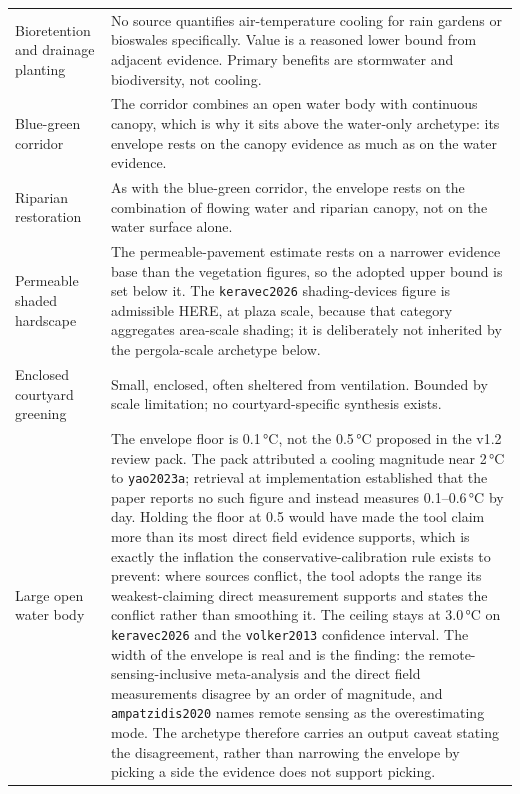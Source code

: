 \begin{longtable}{@{}>{\raggedright\arraybackslash}p{30mm}
                    >{\raggedright\arraybackslash}p{95mm}@{}}
\addlinespace
Bioretention and drainage planting &
No source quantifies air-temperature cooling for rain gardens or bioswales specifically. Value is a reasoned lower bound from adjacent evidence. Primary benefits are stormwater and biodiversity, not cooling. \\
\addlinespace
Blue-green corridor &
The corridor combines an open water body with continuous canopy, which is why it sits above the water-only archetype: its envelope rests on the canopy evidence as much as on the water evidence. \\
\addlinespace
Riparian restoration &
As with the blue-green corridor, the envelope rests on the combination of flowing water and riparian canopy, not on the water surface alone. \\
\addlinespace
Permeable shaded hardscape &
The permeable-pavement estimate rests on a narrower evidence base than the vegetation figures, so the adopted upper bound is set below it. The \texttt{keravec2026} shading-devices figure is admissible HERE, at plaza scale, because that category aggregates area-scale shading; it is deliberately not inherited by the pergola-scale archetype below. \\
\addlinespace
Enclosed courtyard greening &
Small, enclosed, often sheltered from ventilation. Bounded by scale limitation; no courtyard-specific synthesis exists. \\
\addlinespace
Large open water body &
The envelope floor is 0.1\,\si{\degreeCelsius}, not the 0.5\,\si{\degreeCelsius} proposed in the v1.2 review pack. The pack attributed a cooling magnitude near 2\,\si{\degreeCelsius} to \texttt{yao2023a}; retrieval at implementation established that the paper reports no such figure and instead measures 0.1--0.6\,\si{\degreeCelsius} by day. Holding the floor at 0.5 would have made the tool claim more than its most direct field evidence supports, which is exactly the inflation the conservative-calibration rule exists to prevent: where sources conflict, the tool adopts the range its weakest-claiming direct measurement supports and states the conflict rather than smoothing it. The ceiling stays at 3.0\,\si{\degreeCelsius} on \texttt{keravec2026} and the \texttt{volker2013} confidence interval. The width of the envelope is real and is the finding: the remote-sensing-inclusive meta-analysis and the direct field measurements disagree by an order of magnitude, and \texttt{ampatzidis2020} names remote sensing as the overestimating mode. The archetype therefore carries an output caveat stating the disagreement, rather than narrowing the envelope by picking a side the evidence does not support picking. \\

\end{longtable}
